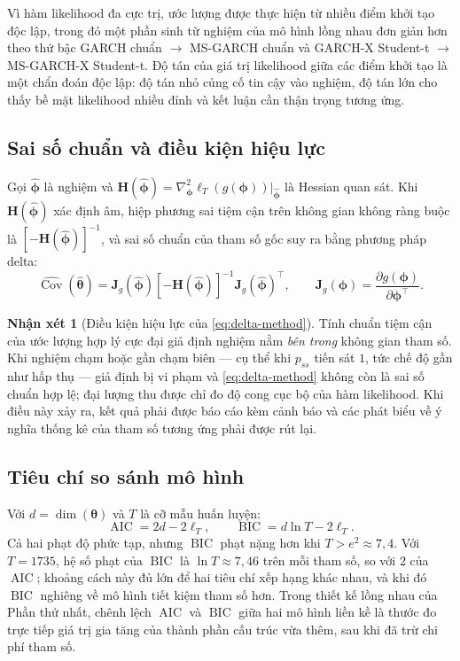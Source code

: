 \documentclass[12pt,a4paper]{article}
\numberwithin{equation}{section}
\theoremstyle{definition}
\newtheorem{remark}{Nhận xét}[section]
\newcommand{\Cov}{\operatorname{Cov}}
\newcommand{\AIC}{\operatorname{AIC}}
\newcommand{\BIC}{\operatorname{BIC}}
\newcommand{\Param}{\symbf{\theta}}
\newcommand{\vecphi}{\symbf{\phi}}
\begin{document}
Vì hàm likelihood đa cực trị, ước lượng được thực hiện từ nhiều điểm khởi tạo độc lập,
trong đó một phần sinh từ nghiệm của mô hình lồng nhau đơn giản hơn theo thứ bậc GARCH
chuẩn $\to$ MS-GARCH chuẩn và GARCH-X Student-t $\to$ MS-GARCH-X Student-t. Độ tán của
giá trị likelihood giữa các điểm khởi tạo là một chẩn đoán độc lập: độ tán nhỏ củng cố
tin cậy vào nghiệm, độ tán lớn cho thấy bề mặt likelihood nhiều đỉnh và kết luận cần thận
trọng tương ứng.

\subsection{Sai số chuẩn và điều kiện hiệu lực}\label{subsec:se}
Gọi $\hat{\vecphi}$ là nghiệm và
$\symbf H(\hat{\vecphi})=\nabla^{2}_{\vecphi}\ell_T(g(\vecphi))\big|_{\hat{\vecphi}}$ là
Hessian quan sát. Khi $\symbf H(\hat{\vecphi})$ xác định âm, hiệp phương sai tiệm cận
trên không gian không ràng buộc là $[-\symbf H(\hat{\vecphi})]^{-1}$, và sai số chuẩn của
tham số gốc suy ra bằng phương pháp delta:
\begin{equation}
  \widehat{\Cov}\!\left(\hat{\Param}\right)
  =\symbf J_g(\hat{\vecphi})\left[-\symbf H(\hat{\vecphi})\right]^{-1}
  \symbf J_g(\hat{\vecphi})^{\top},
  \qquad
  \symbf J_g(\vecphi)=\frac{\partial g(\vecphi)}{\partial\vecphi^{\top}}.
  \label{eq:delta-method}
\end{equation}

\begin{remark}[Điều kiện hiệu lực của \eqref{eq:delta-method}]\label{rem:se-validity}
Tính chuẩn tiệm cận của ước lượng hợp lý cực đại giả định nghiệm nằm \emph{bên trong}
không gian tham số. Khi nghiệm chạm hoặc gần chạm biên --- cụ thể khi $p_{ss}$ tiến sát
$1$, tức chế độ gần như hấp thụ --- giả định bị vi phạm và \eqref{eq:delta-method} không
còn là sai số chuẩn hợp lệ; đại lượng thu được chỉ đo độ cong cục bộ của hàm likelihood.
Khi điều này xảy ra, kết quả phải được báo cáo kèm cảnh báo và các phát biểu về ý nghĩa
thống kê của tham số tương ứng phải được rút lại.
\end{remark}

\subsection{Tiêu chí so sánh mô hình}\label{subsec:ic}
Với $d=\dim(\Param)$ và $T$ là cỡ mẫu huấn luyện:
\begin{equation}
  \AIC=2d-2\ell_T,\qquad \BIC=d\ln T-2\ell_T.
  \label{eq:information-criteria}
\end{equation}
Cả hai phạt độ phức tạp, nhưng $\BIC$ phạt nặng hơn khi $T>e^{2}\approx 7{,}4$. Với
$T=1735$, hệ số phạt của $\BIC$ là $\ln T\approx 7{,}46$ trên mỗi tham số, so với $2$ của
$\AIC$; khoảng cách này đủ lớn để hai tiêu chí xếp hạng khác nhau, và khi đó $\BIC$
nghiêng về mô hình tiết kiệm tham số hơn. Trong thiết kế lồng nhau của Phần thứ nhất,
chênh lệch $\AIC$ và $\BIC$ giữa hai mô hình liền kề là thước đo trực tiếp giá trị gia
tăng của thành phần cấu trúc vừa thêm, sau khi đã trừ chi phí tham số.
\end{document}

